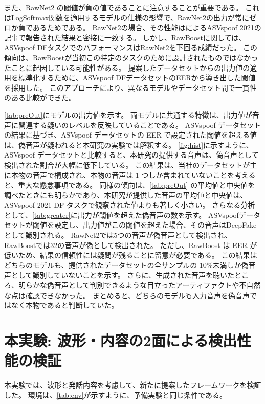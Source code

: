また、RawNet2 の閾値が負の値であることに注意することが重要である。
これはLogSoftmax関数を適用するモデルの仕様の影響で、RawNet2の出力が常にゼロか負であるためである。
RawNet2の場合、その性能は\cite{yamagishi21_asvspoof}によるASVspoof 2021の記事で報告された結果と密接に一致する。
しかし、RawBoostに関しては、ASVspoof DFタスクでのパフォーマンスはRawNet2を下回る成績だった。
この傾向は、RawBoostが当初この特定のタスクのために設計されたものではなかったことに起因している可能性がある。
提案したデータセットからの出力値の適用を標準化するために、ASVspoof DFデータセットのEERから導き出した閾値を採用した。
このアプローチにより、異なるモデルやデータセット間で一貫性のある比較ができた。

\cref{tab:preOut}にモデルの出力値を示す。
両モデルに共通する特徴は、出力値が音声に関連する疑いのレベルを反映していることである。
ASVspoof データセットの結果に基づき、ASVspoof データセットの EER で設定された閾値を超える値は、偽音声が疑われると本研究の実験では解釈する。
\cref{fig:hist}に示すように、ASVspoof データセットと比較すると、本研究の提供する音声は、偽音声として検出された割合が大幅に低下している。
この結果は、当社のデータセットが主に本物の音声で構成され、本物の音声は 1 つしか含まれていないことを考えると、重大な懸念事項である。
同様の傾向は、\cref{tab:preOut} の平均値と中央値を調べたときにも明らかであり、本研究が提供した音声の平均値と中央値は、ASVspoof 2021 DF タスクで観察された値よりも著しく小さい。
さらなる分析として、\cref{tab:greater}に出力が閾値を超えた偽音声の数を示す。
ASVspoofデータセットが閾値を設定し、出力値がこの閾値を超えた場合、その音声はDeepFakeとして識別される。
RawNet2では5つの音声が偽音声として検出され、RawBoostでは32の音声が偽として検出された。
ただし、RawBoost は EER が低いため、結果の信頼性には疑問が残ることに留意が必要である。
この結果はどちらのモデルも、提供されたデータセットの全サンプルの 10\%未満しか偽音声として識別していないことを示す。
さらに、生成された音声を聴いたところ、明らかな偽音声として判別できるような目立ったアーティファクトや不自然な点は確認できなかった。
まとめると、どちらのモデルも入力音声を偽音声ではなく本物であると判断していた。


\section{本実験: 波形・内容の2面による検出性能の検証}\label{sec:cnt_main}
本実験では、波形と発話内容を考慮して、新たに提案したフレームワークを検証した。
環境は、\ref{tab:env}が示すように、予備実験と同じ条件である。

